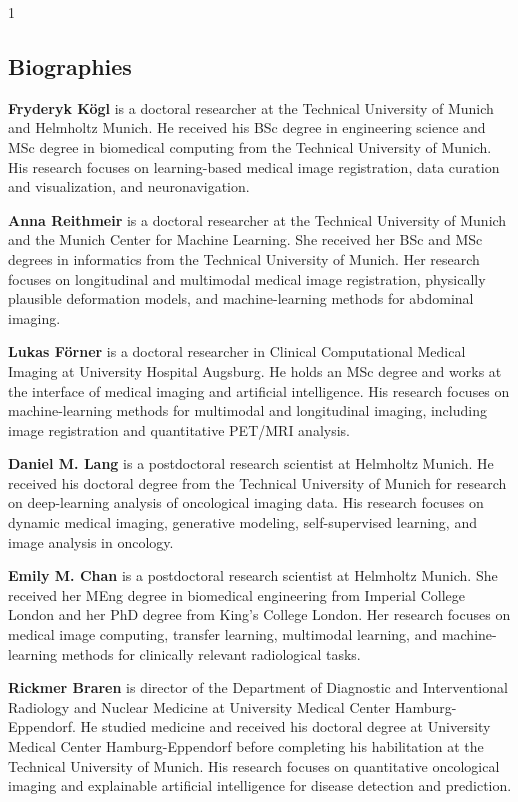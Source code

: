 \documentclass[12pt]{spieman}  %
\begin{document}
\begin{spacing}{1}



\subsection*{Biographies}

\noindent\textbf{Fryderyk K{\"o}gl} is a doctoral researcher at the Technical University of Munich and Helmholtz Munich.
He received his BSc degree in engineering science and MSc degree in biomedical computing from the Technical University of Munich.
His research focuses on learning-based medical image registration, data curation and visualization, and neuronavigation.

\noindent\textbf{Anna Reithmeir} is a doctoral researcher at the Technical University of Munich and the Munich Center for Machine Learning.
She received her BSc and MSc degrees in informatics from the Technical University of Munich.
Her research focuses on longitudinal and multimodal medical image registration, physically plausible deformation models, and machine-learning methods for abdominal imaging.

\noindent\textbf{Lukas F{\"o}rner} is a doctoral researcher in Clinical Computational Medical Imaging at University Hospital Augsburg.
He holds an MSc degree and works at the interface of medical imaging and artificial intelligence.
His research focuses on machine-learning methods for multimodal and longitudinal imaging, including image registration and quantitative PET/MRI analysis.

\noindent\textbf{Daniel M. Lang} is a postdoctoral research scientist at Helmholtz Munich.
He received his doctoral degree from the Technical University of Munich for research on deep-learning analysis of oncological imaging data.
His research focuses on dynamic medical imaging, generative modeling, self-supervised learning, and image analysis in oncology.

\noindent\textbf{Emily M. Chan} is a postdoctoral research scientist at Helmholtz Munich.
She received her MEng degree in biomedical engineering from Imperial College London and her PhD degree from King's College London.
Her research focuses on medical image computing, transfer learning, multimodal learning, and machine-learning methods for clinically relevant radiological tasks.

\noindent\textbf{Rickmer Braren} is director of the Department of Diagnostic and Interventional Radiology and Nuclear Medicine at University Medical Center Hamburg-Eppendorf.
He studied medicine and received his doctoral degree at University Medical Center Hamburg-Eppendorf before completing his habilitation at the Technical University of Munich.
His research focuses on quantitative oncological imaging and explainable artificial intelligence for disease detection and prediction.


\end{spacing}
\end{document}
